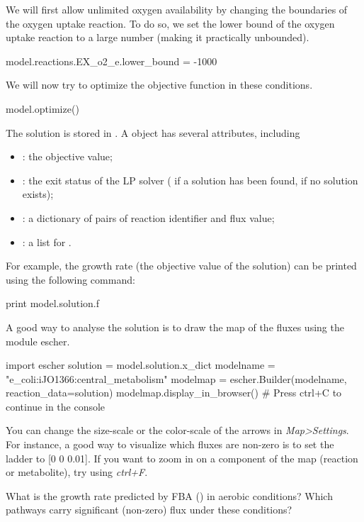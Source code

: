 We will first allow unlimited oxygen availability by changing the boundaries of the oxygen uptake reaction.
To do so, we set the lower bound of the oxygen uptake reaction to a large number (making it practically unbounded).
\begin{code-python}
model.reactions.EX_o2_e.lower_bound = -1000
\end{code-python}
We will now try to optimize the objective function in these conditions.
\begin{code-python}
model.optimize()
\end{code-python}
The solution is stored in .
A  object has several attributes, including
\begin{itemize}
\item {}: the objective value;
\item {}: the exit status of the LP solver ( if a solution has been found,  if no solution exists);
\item {}: a dictionary of pairs of reaction identifier and flux value;
\item {}: a list for .
\end{itemize}
For example, the growth rate (the objective value of the solution) can be printed using the following command:
\begin{code-python}
print model.solution.f
\end{code-python}
A good way to analyse the solution is to draw the map of the fluxes using the module escher.
\begin{code-python}
import escher
solution = model.solution.x_dict
modelname = "e_coli:iJO1366:central_metabolism"
modelmap = escher.Builder(modelname, reaction_data=solution)
modelmap.display_in_browser()
# Press ctrl+C to continue in the console
\end{code-python}
You can change the size-scale or the color-scale of the arrows in \textit{Map>Settings}.
For instance, a good way to visualize which fluxes are non-zero is to set the ladder to [0 0 0.01].
If you want to zoom in on a component of the map (reaction or metabolite), try using \textit{ctrl+F}.

\begin{questions}
\setcounter{question}{1}
\question What is the growth rate predicted by FBA () in aerobic conditions?
Which pathways carry significant (non-zero) flux under these conditions?
\begin{solutionorbox}[3cm]

\end{solutionorbox}
\end{questions}

